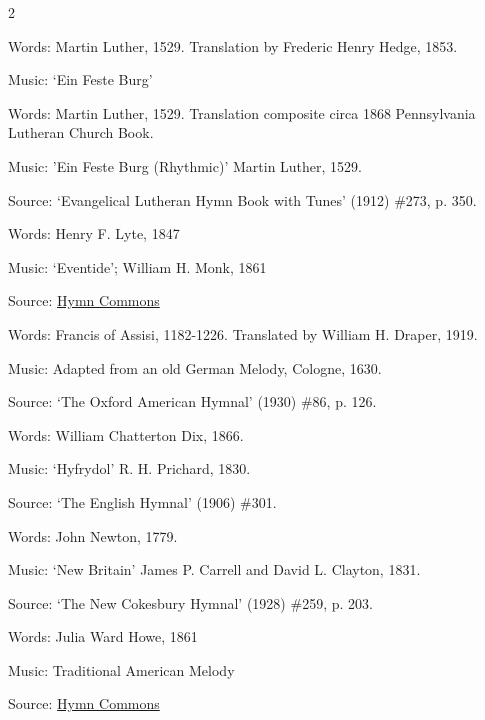 \begin{multicols}{2}
\par\noindent
Words: Martin Luther, 1529. Translation by Frederic Henry Hedge, 1853.
\par\noindent
Music: `Ein Feste Burg'


\par\noindent
Words: Martin Luther, 1529. Translation composite circa 1868 Pennsylvania Lutheran Church Book.
\par\noindent
Music: 'Ein Feste Burg (Rhythmic)' Martin Luther, 1529.
\par\noindent
Source: `Evangelical Lutheran Hymn Book with Tunes' (1912) \#273, p. 350.


\par\noindent
Words: Henry F. Lyte, 1847
\par\noindent
Music: `Eventide'; William H. Monk, 1861
\par\noindent
Source: \href{https://hymncommons.org}{Hymn Commons}


\par\noindent
Words: Francis of Assisi, 1182-1226. Translated by William H. Draper, 1919. 
\par\noindent
Music: Adapted from an old German Melody, Cologne, 1630.
\par\noindent
Source: `The Oxford American Hymnal' (1930) \#86, p. 126.


\par\noindent
Words: William Chatterton Dix, 1866.
\par\noindent
Music: `Hyfrydol' R. H. Prichard, 1830.
\par\noindent
Source: `The English Hymnal' (1906) \#301. 


\par\noindent
Words: John Newton, 1779.
\par\noindent
Music: `New Britain' James P. Carrell and David L. Clayton, 1831.
\par\noindent
Source: `The New Cokesbury Hymnal' (1928) \#259, p. 203.


\par\noindent
Words: Julia Ward Howe, 1861
\par\noindent
Music: Traditional American Melody
\par\noindent
Source: \href{https://hymncommons.org}{Hymn Commons}



\end{multicols}
